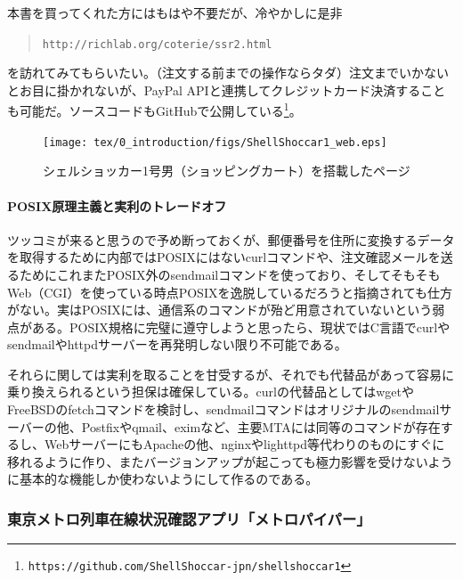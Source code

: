 本書を買ってくれた方にはもはや不要だが、冷やかしに是非
\begin{quotation}
\verb|http://richlab.org/coterie/ssr2.html|
\end{quotation}
を訪れてみてもらいたい。（注文する前までの操作ならタダ）注文までいかないとお目に掛かれないが、PayPal APIと連携してクレジットカード決済することも可能だ。ソースコードもGitHubで公開している\footnote{\verb|https://github.com/ShellShoccar-jpn/shellshoccar1|}。

\begin{figure}[htb]
	\begin{center}
		\vspace{10mm}
		\texttt{[image: tex/0\_introduction/figs/ShellShoccar1\_web.eps]}
		\vspace{0mm}
		\caption{シェルショッカー1号男（ショッピングカート）を搭載したページ}
		\label{fig:ShellShoccar1_web}
		\vspace{0mm}
	\end{center}
\end{figure}

\paragraph{POSIX原理主義と実利のトレードオフ}

ツッコミが来ると思うので予め断っておくが、郵便番号を住所に変換するデータを取得するために内部ではPOSIXにはないcurlコマンドや、注文確認メールを送るためにこれまたPOSIX外のsendmailコマンドを使っており、そしてそもそもWeb（CGI）を使っている時点POSIXを逸脱しているだろうと指摘されても仕方がない。実はPOSIXには、通信系のコマンドが殆ど用意されていないという弱点がある。POSIX規格に完璧に遵守しようと思ったら、現状ではC言語でcurlやsendmailやhttpdサーバーを再発明しない限り不可能である。

それらに関しては実利を取ることを甘受するが、それでも代替品があって容易に乗り換えられるという担保は確保している。curlの代替品としてはwgetやFreeBSDのfetchコマンドを検討し、sendmailコマンドはオリジナルのsendmailサーバーの他、Postfixやqmail、eximなど、主要MTAには同等のコマンドが存在するし、WebサーバーにもApacheの他、nginxやlighttpd等代わりのものにすぐに移れるように作り、またバージョンアップが起こっても極力影響を受けないように基本的な機能しか使わないようにして作るのである。

\subsubsection*{東京メトロ列車在線状況確認アプリ「メトロパイパー」}

